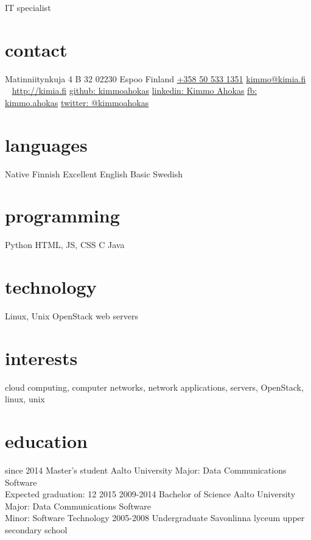 \documentclass[]{friggeri-cv}
\begin{document}
       {IT specialist}

\begin{aside}
  \section{contact}
    Matinniitynkuja 4 B 32
    02230 Espoo
    Finland
    \href{tel:+358505331351}{+358 50 533 1351}
    \href{mailto:kimmo@kimia.fi}{kimmo@kimia.fi}
    ~
    \href{http://kimia.fi}{http://kimia.fi}
    \href{https://github.com/kimmoahokas}{github: kimmoahokas}
    \href{https://www.linkedin.com/in/kimmoahokas}{linkedin: Kimmo Ahokas}
    \href{https://www.facebook.com/kimmo.ahokas}{fb: kimmo.ahokas}
    \href{https://twitter.com/kimmoahokas}{twitter: @kimmoahokas}
  \section{languages}
    Native Finnish
    Excellent English
    Basic Swedish
  \section{programming}
    Python
    HTML, JS, CSS
    C
    Java
  \section{technology}
    Linux, Unix
    OpenStack
    web servers
\end{aside}

\section{interests}

cloud computing, computer networks, network applications, servers, OpenStack,
linux, unix

\section{education}

\begin{entrylist}
  \entry
    {since 2014}
    {Master's student}
    {Aalto University}
    {Major: Data Communications Software\\
    Expected graduation: 12 2015}
  \entry
    {2009-2014}
    {Bachelor of Science}
    {Aalto University}
    {Major: Data Communications Software\\
    Minor: Software Technology}
  \entry
    {2005-2008}
    {Undergraduate}
    {Savonlinna lyceum upper secondary school}
    {}
\end{entrylist}
\end{document}
